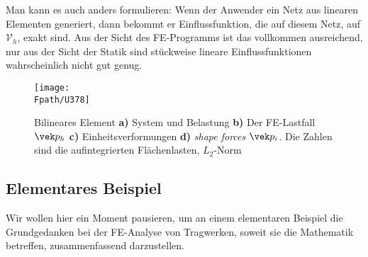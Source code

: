 Man kann es auch anders formulieren: Wenn der Anwender ein Netz aus linearen Elementen generiert, dann bekommt er Einflussfunktion, die auf diesem Netz, auf $\mathcal{V}_h$, exakt sind. Aus der Sicht des FE-Programms ist das vollkommen ausreichend, nur aus der Sicht der Statik sind st\"{u}ckweise lineare Einflussfunktionen wahrscheinlich nicht gut genug.

\begin{figure}[tbp]
\centering
\if {} \sidecaption \fi
\texttt{[image: \\Fpath/U378]}
\caption{Bilineares Element {\bf a)\/} System und Belastung {\bf b)\/} Der FE-Lastfall $\vek p_h$ {\bf c) \/} Einheitsverformungen {\bf d)\/} {\em shape forces\/} $\vek p_i$. Die Zahlen sind die aufintegrierten Fl\"{a}chenlasten, $L_2$-Norm} \label{U378}
\end{figure}%

\textcolor{blau2}{\section{Elementares Beispiel}}
Wir wollen hier ein Moment pausieren, um an einem elementaren Beispiel die Grundgedanken bei der FE-Analyse von Tragwerken, soweit sie die Mathematik betreffen, zusammenfassend darzustellen.

